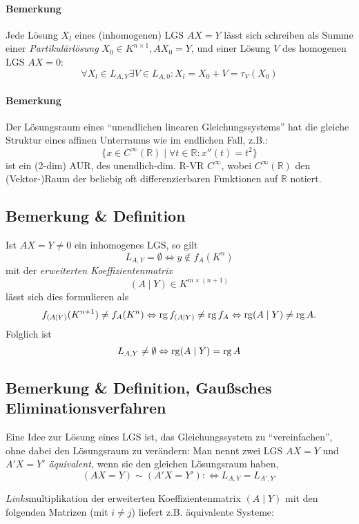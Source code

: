  	\paragraph{Bemerkung}
 		Jede Lösung $ X_l $ eines (inhomogenen) LGS $AX=Y$ lässt sich schreiben als Summe einer \emph{Partikulärlösung} $ X_0 \in K^{n\times 1},AX_0 = Y $, und einer Lösung $V$ des homogenen LGS $ AX = 0 $:
 		\[
 			\forall X_l\in L_{A,Y}\exists V\in L_{A,0}:X_l=X_0+V=\tau_V(X_0)
 		\]
 	\paragraph{Bemerkung}
 		Der Lösungsraum eines "`unendlichen linearen Gleichungssystems"' hat die gleiche Struktur eines affinen Unterraums wie im endlichen Fall, z.B.:
 		\[
 			\{x\in C^\infty(\mathbb{R})\mid \forall t\in \mathbb{R}:x''(t) = t^2 \}
 		\]
 		ist ein (2-dim) AUR, des unendlich-dim. R-VR $C^\infty$, wobei $ C^\infty(\mathbb{R}) $ den (Vektor-)Raum der beliebig oft differenzierbaren Funktionen auf $ \mathbb{R} $ notiert.
 \subsection{Bemerkung \& Definition}
 	\begin{Definition}
 		Ist $ AX=Y \neq 0$ ein inhomogenes LGS, so gilt
 		\[
 			L_{A,Y} = \emptyset \Leftrightarrow y\notin f_A(K^n)
 		\]
 		mit der \emph{erweiterten Koeffizientenmatrix}
 		\[
 			(A\mid Y) \in K^{m\times (n+1)}
 		\]
 		lässt sich dies formulieren als
 		\[
 			f_{(A\mid Y)}(K^{n+1})\neq f_A(K^n) \Leftrightarrow \operatorname{rg} f_{(A\mid Y)}\neq \operatorname{rg} f_A \Leftrightarrow \operatorname{rg} (A\mid Y) \neq \operatorname{rg} A.
 		\]
 		Folglich ist
 		\[
 			L_{A,Y} \neq \emptyset \Leftrightarrow \operatorname{rg} (A\mid Y) = \operatorname{rg} A
 		\]
 	\end{Definition}
 \subsection{Bemerkung \& Definition, Gaußsches Eliminationsverfahren}
 	\begin{Definition}
 		Eine Idee zur Lösung eines LGS ist, das Gleichungssystem zu "`vereinfachen"', ohne dabei den Lösungsraum zu verändern: Man nennt zwei LGS $ AX=Y$ und $A'X=Y' $ \emph{äquivalent}, wenn sie den gleichen Lösungsraum haben,
 		\[
 			(AX=Y)\sim (A'X=Y'):\Leftrightarrow L_{A,Y} = L_{A',Y'}
 		\]
 	\end{Definition}
 	\emph{Links}multiplikation der erweiterten Koeffizientenmatrix $ (A\mid Y) $ mit den folgenden Matrizen (mit $ i\neq j $) liefert z.B. äquivalente Systeme:

